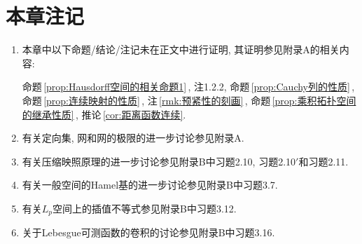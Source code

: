 	\section*{本章注记}
	\begin{enumerate}
	\item 本章中以下命题/结论/注记未在正文中进行证明, 其证明参见附录A的相关内容:

		\hspace{4em}命题\,\ref{prop:Hausdorff空间的相关命题1}\,, 注1.2.2, 命题\,\ref{prop:Cauchy列的性质}\,, 命题\,\ref{prop:连续映射的性质}\,, 注\,\ref{rmk:预紧性的刻画}\,, 命题\,\ref{prop:乘积拓扑空间的继承性质}\,, 推论\,\ref{cor:距离函数连续}.
	\item 有关定向集, 网和网的极限的进一步讨论参见附录A.
	\item 有关压缩映照原理的进一步讨论参见附录B中习题2.10, 习题2.10$ ' $和习题2.11.
	\item 有关一般空间的Hamel基的进一步讨论参见附录B中习题3.7.
	\item 有关$ L_p $空间上的插值不等式参见附录B中习题3.12.
	\item 关于Lebesgue可测函数的卷积的讨论参见附录B中习题3.16.
	\end{enumerate}